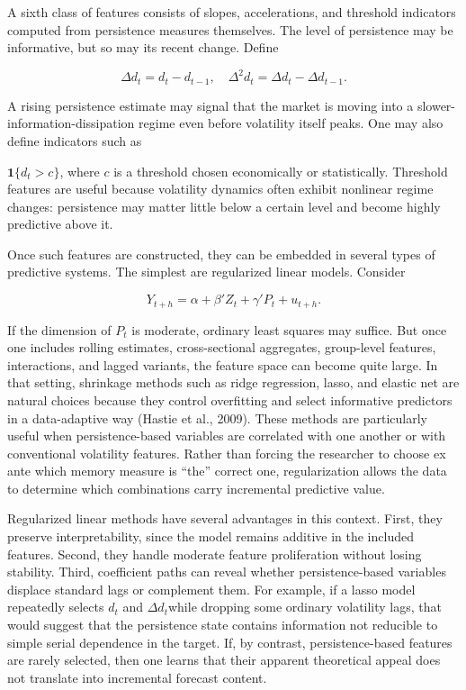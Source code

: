 \documentclass[12pt]{article}
\begin{document}
A sixth class of features consists of slopes, accelerations, and threshold indicators computed from persistence measures themselves. The level of persistence may be informative, but so may its recent change. Define

\[\Delta d_t = d_t - d_{t-1}, \quad \Delta^2 d_t = \Delta d_t - \Delta d_{t-1}.\]

A rising persistence estimate may signal that the market is moving into a slower-information-dissipation regime even before volatility itself peaks. One may also define indicators such as

$\mathbf{1}\{d_t>c\}$,
where $c$ is a threshold chosen economically or statistically. Threshold features are useful because volatility dynamics often exhibit nonlinear regime changes: persistence may matter little below a certain level and become highly predictive above it.

Once such features are constructed, they can be embedded in several types of predictive systems. The simplest are regularized linear models. Consider

\[Y_{t+h} = \alpha + \beta' Z_t + \gamma' P_t + u_{t+h}.\]

If the dimension of $P_t$ is moderate, ordinary least squares may suffice. But once one includes rolling estimates, cross-sectional aggregates, group-level features, interactions, and lagged variants, the feature space can become quite large. In that setting, shrinkage methods such as ridge regression, lasso, and elastic net are natural choices because they control overfitting and select informative predictors in a data-adaptive way (Hastie et al., 2009). These methods are particularly useful when persistence-based variables are correlated with one another or with conventional volatility features. Rather than forcing the researcher to choose ex ante which memory measure is ``the'' correct one, regularization allows the data to determine which combinations carry incremental predictive value.

Regularized linear methods have several advantages in this context. First, they preserve interpretability, since the model remains additive in the included features. Second, they handle moderate feature proliferation without losing stability. Third, coefficient paths can reveal whether persistence-based variables displace standard lags or complement them. For example, if a lasso model repeatedly selects $d_t$ and $\Delta d_t$while dropping some ordinary volatility lags, that would suggest that the persistence state contains information not reducible to simple serial dependence in the target. If, by contrast, persistence-based features are rarely selected, then one learns that their apparent theoretical appeal does not translate into incremental forecast content.
\end{document}
